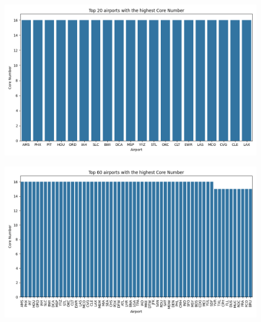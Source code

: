 \documentclass[12pt]{article}
\begin{document}
    \begin{figure}[H]
        \centering
        \includegraphics[width=0.8\linewidth]{img/core_number}
    \end{figure}
    \begin{figure}[H]
        \centering
        \includegraphics[width=0.8\linewidth]{img/more_core_number}
    \end{figure}
\end{document}
